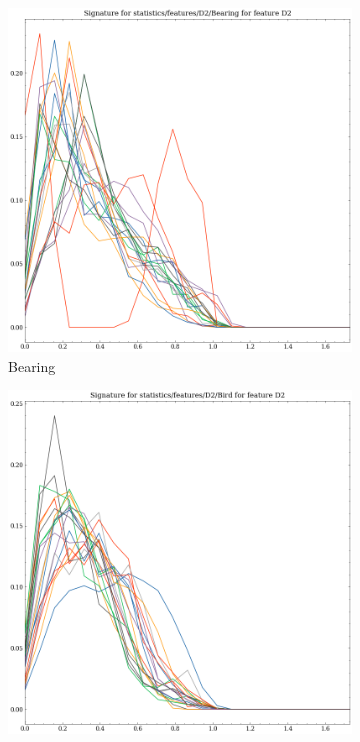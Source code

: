 \begin{figure}[t!p]
    \begin{subfigure}[b]{0.23\textwidth}
        \includegraphics[width=\textwidth]{assets/feature_extraction/D2/Bearing.png}
        \caption{Bearing}
    \end{subfigure}
    \hfill
    \begin{subfigure}[b]{0.23\textwidth}
        \includegraphics[width=\textwidth]{assets/feature_extraction/D2/Bird.png}

\end{subfigure}
\end{figure}
